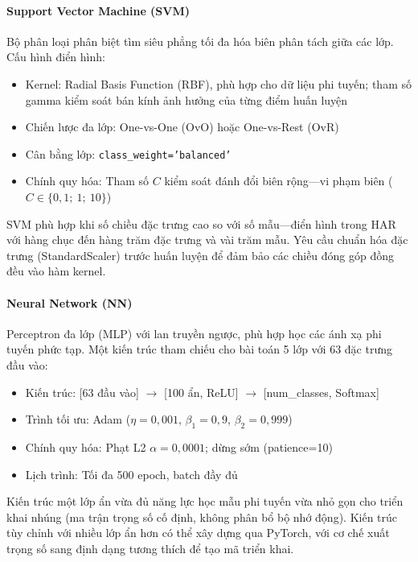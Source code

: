 \paragraph{Support Vector Machine (SVM)}
Bộ phân loại phân biệt tìm siêu phẳng tối đa hóa biên phân tách giữa các lớp. Cấu hình điển hình:
\begin{itemize}
    \item Kernel: Radial Basis Function (RBF), phù hợp cho dữ liệu phi tuyến; tham số gamma kiểm soát bán kính ảnh hưởng của từng điểm huấn luyện
    \item Chiến lược đa lớp: One-vs-One (OvO) hoặc One-vs-Rest (OvR)
    \item Cân bằng lớp: \texttt{class\_weight='balanced'}
    \item Chính quy hóa: Tham số $C$ kiểm soát đánh đổi biên rộng---vi phạm biên ($C \in \{0{,}1;\ 1;\ 10\}$)
\end{itemize}
SVM phù hợp khi số chiều đặc trưng cao so với số mẫu---điển hình trong HAR với hàng chục đến hàng trăm đặc trưng và vài trăm mẫu. Yêu cầu chuẩn hóa đặc trưng (StandardScaler) trước huấn luyện để đảm bảo các chiều đóng góp đồng đều vào hàm kernel.

\paragraph{Neural Network (NN)}
Perceptron đa lớp (MLP) với lan truyền ngược, phù hợp học các ánh xạ phi tuyến phức tạp. Một kiến trúc tham chiếu cho bài toán 5 lớp với 63 đặc trưng đầu vào:
\begin{itemize}
    \item Kiến trúc: [63 đầu vào] $\rightarrow$ [100 ẩn, ReLU] $\rightarrow$ [num\_classes, Softmax]
    \item Trình tối ưu: Adam ($\eta=0{,}001$, $\beta_1=0{,}9$, $\beta_2=0{,}999$)
    \item Chính quy hóa: Phạt L2 $\alpha=0{,}0001$; dừng sớm (patience=10)
    \item Lịch trình: Tối đa 500 epoch, batch đầy đủ
\end{itemize}
Kiến trúc một lớp ẩn vừa đủ năng lực học mẫu phi tuyến vừa nhỏ gọn cho triển khai nhúng (ma trận trọng số cố định, không phân bổ bộ nhớ động). Kiến trúc tùy chỉnh với nhiều lớp ẩn hơn có thể xây dựng qua PyTorch, với cơ chế xuất trọng số sang định dạng tương thích để tạo mã triển khai.

